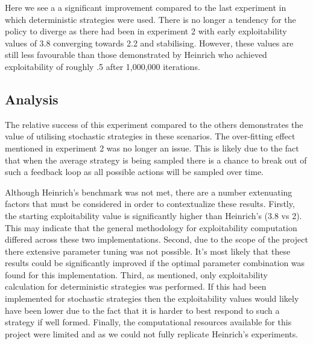 Here we see a a significant improvement compared to the last experiment in which deterministic strategies were used.
There is no longer a tendency for the policy to diverge as there had been in experiment 2 with
early exploitability values of 3.8 converging towards 2.2 and stabilising.
However, these values are still less favourable than those demonstrated by Heinrich who achieved
exploitability of roughly .5 after 1,000,000 iterations.

\subsection{Analysis}\label{subsec:analysis3}
The relative success of this experiment compared to the others demonstrates the value of
utilising stochastic strategies in these scenarios.
The over-fitting effect mentioned in experiment 2 was no longer an issue.
This is likely due to the fact that when the average strategy is being sampled there is a
chance to break out of such a feedback loop as all possible actions will be sampled over time.

Although Heinrich's benchmark was not met, there are a number extenuating factors that must be
considered in order to contextualize these results.
Firstly, the starting exploitability value is significantly higher than Heinrich's (3.8 vs 2).
This may indicate that the general methodology for exploitability computation differed across these
two implementations.
Second, due to the scope of the project there extensive parameter tuning was not possible.
It's most likely that these results could be significantly improved if the optimal parameter
combination was found for this implementation.
Third, as mentioned, only exploitability calculation for deterministic strategies was performed.
If this had been implemented for stochastic strategies then the exploitability values would
likely have been lower due to the fact that it is harder to best respond to such a strategy if well formed.
Finally, the computational resources available for this project were limited and as we could not
fully replicate Heinrich's experiments.
